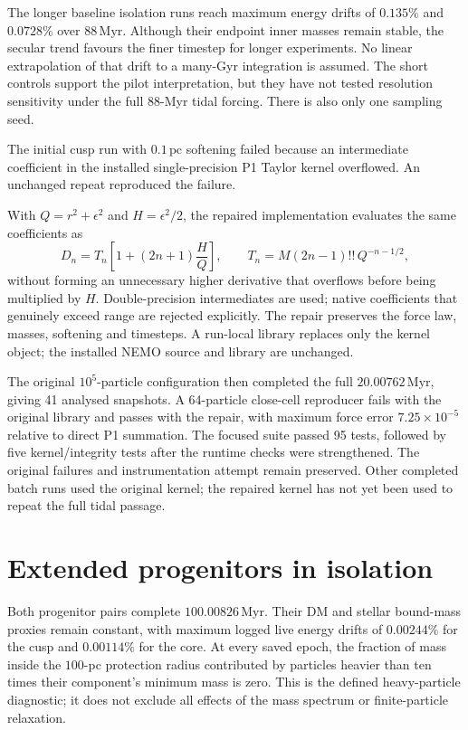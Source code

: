 \documentclass[11pt,a4paper]{article}
\newcommand{\pc}{\,\mathrm{pc}}
\newcommand{\Myr}{\,\mathrm{Myr}}
\begin{document}
The longer baseline isolation runs reach maximum energy drifts of $0.135\%$
and $0.0728\%$ over $88\Myr$. Although their endpoint inner masses remain
stable, the secular trend favours the finer timestep for longer experiments.
No linear extrapolation of that drift to a many-Gyr integration is assumed.
The short controls support the pilot interpretation, but they have not tested
resolution sensitivity under the full $88$-Myr tidal forcing. There is also
only one sampling seed.

The initial cusp run with $0.1\pc$ softening failed because an intermediate
coefficient in the installed single-precision P1 Taylor kernel overflowed.
An unchanged repeat reproduced the failure.

With
$Q=r^2+\epsilon^2$ and $H=\epsilon^2/2$, the repaired implementation evaluates
the same coefficients as
\begin{equation}
 D_n=T_n\left[1+(2n+1)\frac{H}{Q}\right],\qquad
 T_n=M(2n-1)!!\,Q^{-n-1/2},
\end{equation}
without forming an unnecessary higher derivative that overflows before being
multiplied by $H$. Double-precision intermediates are used; native coefficients
that genuinely exceed range are rejected explicitly. The repair preserves
the force law, masses, softening and timesteps. A run-local library replaces
only the kernel object; the installed NEMO source and library are unchanged.

The original $10^5$-particle configuration then completed the full
$20.00762\Myr$, giving 41 analysed snapshots. A 64-particle close-cell
reproducer fails with the original library and passes with the repair, with
maximum force error $7.25\times10^{-5}$ relative to direct P1 summation.
The focused suite passed 95 tests, followed by five kernel/integrity tests
after the runtime checks were strengthened. The original failures and
instrumentation attempt remain preserved. Other completed batch runs used
the original kernel; the repaired kernel has not yet been used to repeat
the full tidal passage.

\FloatBarrier
\section{Extended progenitors in isolation}
\label{sec:progenitors}

Both progenitor pairs complete $100.00826\Myr$. Their DM and stellar bound-mass
proxies remain constant, with maximum logged live energy drifts of
$0.00244\%$ for the cusp and $0.00114\%$ for the core. At every saved epoch,
the fraction of mass inside the $100$-pc protection radius contributed by
particles heavier than ten times their component's minimum mass is zero.
This is the defined heavy-particle diagnostic; it does not exclude all
effects of the mass spectrum or finite-particle relaxation.
\end{document}
